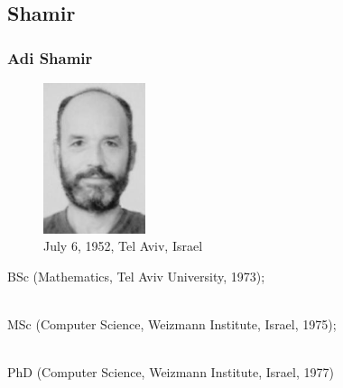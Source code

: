 \documentclass[slidestop,compress,mathserif]{beamer}
\begin{document}
\subsection{\hfill Shamir}

\begin{frame}
  \frametitle{Adi Shamir}
  \begin{multicols}{2}
    \begin{minipage}[c]{0.5\textwidth}
      \begin{figure}[H]
        \includegraphics[width=3cm]{Shamir.jpg}
        \caption{July 6, 1952, Tel Aviv, Israel}
      \end{figure}
    \end{minipage}

    BSc (Mathematics, Tel Aviv University, 1973); 
   
    ~\\ 
    
    MSc (Computer Science, Weizmann Institute, Israel, 1975); 
    
    ~\\

    PhD (Computer Science, Weizmann Institute, Israel, 1977)    
  \end{multicols}
  
\end{frame}
\end{document}
